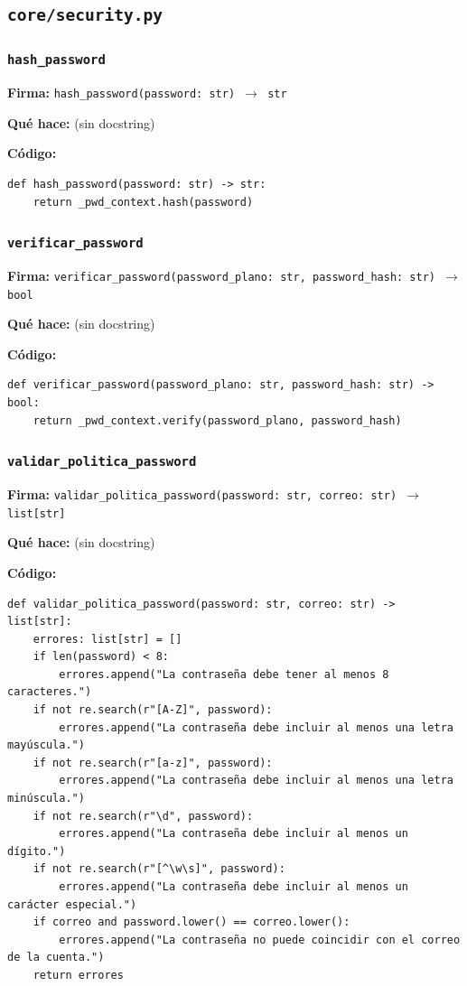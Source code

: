 \documentclass[11pt,a4paper]{article}
\begin{document}
\subsection{\texttt{core/security.py}}

\subsubsection*{\texttt{hash\_password}}
\textbf{Firma:} \texttt{hash\_password(password: str) $\rightarrow$ str}

\textbf{Qué hace:} (sin docstring)

\textbf{Código:}
\begin{lstlisting}
def hash_password(password: str) -> str:
    return _pwd_context.hash(password)
\end{lstlisting}

\subsubsection*{\texttt{verificar\_password}}
\textbf{Firma:} \texttt{verificar\_password(password\_plano: str, password\_hash: str) $\rightarrow$ bool}

\textbf{Qué hace:} (sin docstring)

\textbf{Código:}
\begin{lstlisting}
def verificar_password(password_plano: str, password_hash: str) -> bool:
    return _pwd_context.verify(password_plano, password_hash)
\end{lstlisting}

\subsubsection*{\texttt{validar\_politica\_password}}
\textbf{Firma:} \texttt{validar\_politica\_password(password: str, correo: str) $\rightarrow$ list[str]}

\textbf{Qué hace:} (sin docstring)

\textbf{Código:}
\begin{lstlisting}
def validar_politica_password(password: str, correo: str) -> list[str]:
    errores: list[str] = []
    if len(password) < 8:
        errores.append("La contraseña debe tener al menos 8 caracteres.")
    if not re.search(r"[A-Z]", password):
        errores.append("La contraseña debe incluir al menos una letra mayúscula.")
    if not re.search(r"[a-z]", password):
        errores.append("La contraseña debe incluir al menos una letra minúscula.")
    if not re.search(r"\d", password):
        errores.append("La contraseña debe incluir al menos un dígito.")
    if not re.search(r"[^\w\s]", password):
        errores.append("La contraseña debe incluir al menos un carácter especial.")
    if correo and password.lower() == correo.lower():
        errores.append("La contraseña no puede coincidir con el correo de la cuenta.")
    return errores
\end{lstlisting}
\end{document}
